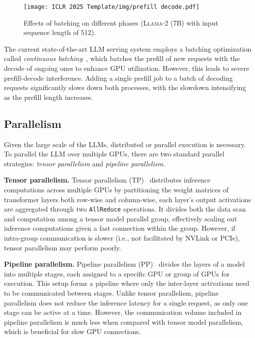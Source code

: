 \begin{wrapfigure}{r}{0.5\linewidth}
    \centering
    \texttt{[image: ICLR 2025 Template/img/prefill decode.pdf]}
    \caption{Effects of batching on different phases (\textsc{Llama-2 (7B)} with input sequence length of 512).}
    \label{fig:batch}
\end{wrapfigure} 

The current state-of-the-art LLM serving system employs a batching optimization called \textit{continuous batching}~\cite{yu2022orca}, which batches the prefill of new requests with the decode of ongoing ones to enhance GPU utilization. However, this leads to severe prefill-decode interference. Adding a single prefill job to a batch of decoding requests significantly slows down both processes, with the slowdown intensifying as the prefill length increases.

\subsection{Parallelism}
Given the large scale of the LLMs, distributed or parallel execution is necessary. To parallel the LLM over multiple GPUs, there are two standard parallel strategies: \textit{tensor parallelism} and \textit{pipeline parallelism}.

\textbf{Tensor parallelism.} Tensor parallelism (TP)~\cite{narayanan2021efficient} distributes inference computations across multiple GPUs by partitioning the weight matrices of transformer layers both row-wise and column-wise, each layer's output activations are aggregated through two \texttt{AllReduce} operations. It divides both the data scan and computation among a tensor model parallel group, effectively scaling out inference computations given a fast connection within the group. However, if intra-group communication is slower (i.e., not facilitated by NVLink or PCIe), tensor parallelism may perform poorly.

\textbf{Pipeline parallelism.} Pipeline parallelism (PP)~\cite{huang2019gpipe} divides the layers of a model into multiple stages, each assigned to a specific GPU or group of GPUs for execution. This setup forms a pipeline where only the inter-layer activations need to be communicated between stages. Unlike tensor parallelism, pipeline parallelism does not reduce the inference latency for a single request, as only one stage can be active at a time. However, the communication volume included in pipeline parallelism
is much less when compared with tensor model parallelism, which is beneficial for slow GPU connections.

